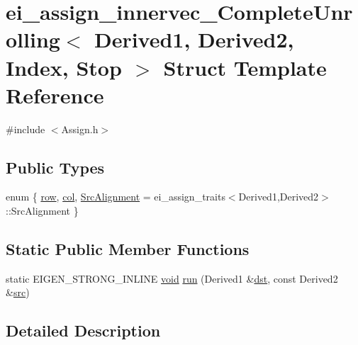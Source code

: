 \hypertarget{structei__assign__innervec___complete_unrolling}{\section{ei\-\_\-assign\-\_\-innervec\-\_\-\-Complete\-Unrolling$<$ Derived1, Derived2, Index, Stop $>$ Struct Template Reference}
\label{structei__assign__innervec___complete_unrolling}
}


{\ttfamily \#include $<$Assign.\-h$>$}

\subsection*{Public Types}
\begin{DoxyCompactItemize}
\item 
enum \{ \hyperlink{structei__assign__innervec___complete_unrolling_a6e00c2b5e63354e8c5c58a3bdcf5d35aa9c9074383c785bf80000ccc1ac695fc8}{row}, 
\hyperlink{structei__assign__innervec___complete_unrolling_a6e00c2b5e63354e8c5c58a3bdcf5d35aa55eca4dbd3e9e819566964e5b7fa1989}{col}, 
\hyperlink{structei__assign__innervec___complete_unrolling_a6e00c2b5e63354e8c5c58a3bdcf5d35aac04b51cd56c6c2a01a48d1356d251f60}{Src\-Alignment} = ei\-\_\-assign\-\_\-traits$<$Derived1,Derived2$>$\-:\-:Src\-Alignment
 \}
\end{DoxyCompactItemize}
\subsection*{Static Public Member Functions}
\begin{DoxyCompactItemize}
\item 
static E\-I\-G\-E\-N\-\_\-\-S\-T\-R\-O\-N\-G\-\_\-\-I\-N\-L\-I\-N\-E \hyperlink{group___u_a_v_objects_plugin_ga444cf2ff3f0ecbe028adce838d373f5c}{void} \hyperlink{structei__assign__innervec___complete_unrolling_ab0e4d36242ef53f7f76c904cacc4a1e2}{run} (Derived1 \&\hyperlink{glext_8h_a92034251bfd455d524a9b5610cddba00}{dst}, const Derived2 \&\hyperlink{glext_8h_a72e0fdf0f845ded60b1fada9e9195cd7}{src})
\end{DoxyCompactItemize}


\subsection{Detailed Description}
